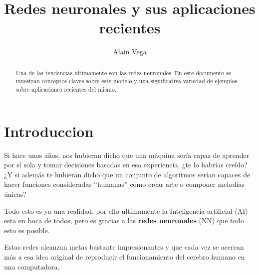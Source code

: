 \documentclass[runningheads]{llncs} %
\begin{document}
\title{Redes neuronales y sus aplicaciones recientes}

\author{Alain Vega \\ }



\maketitle           

\begin{abstract}
Una de las tendencias ultimamente son las redes neuronales. En este documento
se muestran conceptos claves sobre este modelo y una significativa variedad
de ejemplos sobre aplicaciones recientes del mismo.

\end{abstract}
\section{Introduccion}
Si hace unos años, nos hubieran dicho que una máquina sería capaz de aprender 
por sí sola y tomar decisiones basadas en esa experiencia, ¿te lo habrías creído? 
¿Y si además te hubieran dicho que un conjunto de algoritmos serían capaces de
hacer funciones consideradas \textquotedblleft{humanas}\textquotedblright{}
como crear arte o componer melodías únicas? \cite{int1}

Todo esto es ya una realidad, por ello ultimamente la Inteligencia artificial (AI) 
esta en boca de todos, pero es gracias a las \textbf{redes neuronales} (NN)
que todo esto es posible. 

Estas redes alcanzan metas bastante impresionantes y que cada vez se acercan 
más a esa idea original de reproducir el funcionamiento del cerebro humano 
en una computadora. 
\end{document}
